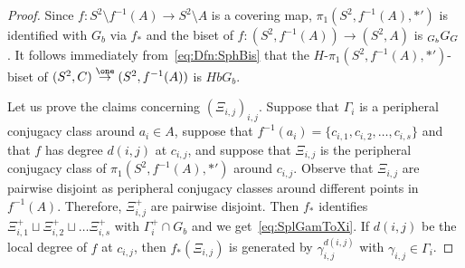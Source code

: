 \documentclass{amsart}
\begin{document}
\begin{proof} 
  Since $f\colon S^2\setminus f^{-1}(A)\to S^2\setminus A$ is a
  covering map, $\pi_1(S^2,f^{-1}(A), *')$ is identified with $G_b$ via
  $f_*$ and the biset of $f\colon (S^2,f^{-1}(A))\to (S^2,A)$ is
  $\subscript{G_b}G_G$. It follows immediately from~\eqref{eq:Dfn:SphBis}
  that the $H$-$\pi_1(S^2,f^{-1}(A),*')$-biset of
  $(S^2,C)\overset{\one}{\rightarrow} (S^2,f^{-1}(A))$ is $H b G_b$.
  
  Let us prove the claims concerning $(\Xi_{i,j})_{i,j}$. Suppose that
  $\Gamma_i$ is a peripheral conjugacy class around $a_i\in A$,
  suppose that $f^{-1}(a_i)=\{c_{i,1},c_{i,2},\dots, c_{i,s}\}$ and
  that $f$ has degree $d(i,j)$ at $c_{i,j}$, and suppose that
  $\Xi_{i,j}$ is the peripheral conjugacy class of
  $\pi_1(S^2,f^{-1}(A),*')$ around $c_{i,j}$. Observe that $\Xi_{i,j}$
  are pairwise disjoint as peripheral conjugacy classes around
  different points in $f^{-1}(A)$. Therefore, $\Xi^{+}_{i,j}$ are
  pairwise disjoint. Then $f_*$ identifies
  $\Xi^{+}_{i,1}\sqcup \Xi^{+}_{i,2}\sqcup\dots \Xi^{+}_{i,s}$ with
  $\Gamma_i^+\cap G_b$ and we get~\eqref{eq:SplGamToXi}. If $d(i,j)$
  be the local degree of $f$ at $c_{i,j}$, then $f_*(\Xi_{i,j})$ is
  generated by $\gamma_{i,j}^{d(i,j)}$ with
  $\gamma_{i,j}\in \Gamma_i$.
\end{proof}
  
\end{document}
